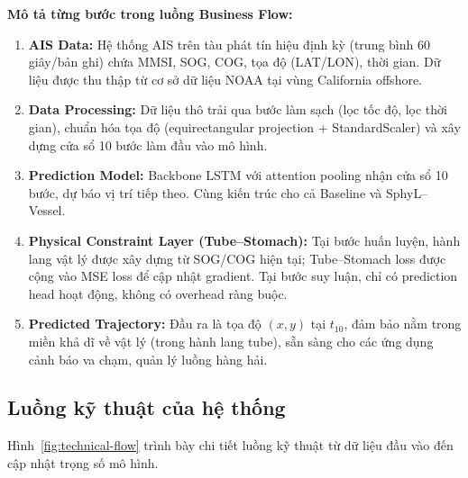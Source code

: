 \documentclass{IEEEtran}
\begin{document}
\textbf{Mô tả từng bước trong luồng Business Flow:}
\begin{enumerate}
  \item \textbf{AIS Data:} Hệ thống AIS trên tàu phát tín hiệu
        định kỳ (trung bình 60 giây/bản ghi) chứa MMSI, SOG, COG,
        tọa độ (LAT/LON), thời gian. Dữ liệu được thu thập từ
        cơ sở dữ liệu NOAA tại vùng California offshore.
  \item \textbf{Data Processing:} Dữ liệu thô trải qua bước làm sạch
        (lọc tốc độ, lọc thời gian), chuẩn hóa tọa độ (equirectangular
        projection + StandardScaler) và xây dựng cửa sổ 10 bước
        làm đầu vào mô hình.
  \item \textbf{Prediction Model:} Backbone LSTM với attention pooling
        nhận cửa sổ 10 bước, dự báo vị trí tiếp theo.
        Cùng kiến trúc cho cả Baseline và SphyL--Vessel.
  \item \textbf{Physical Constraint Layer (Tube--Stomach):}
        Tại bước huấn luyện, hành lang vật lý được xây dựng từ SOG/COG
        hiện tại; Tube--Stomach loss được cộng vào MSE loss để
        cập nhật gradient. Tại bước suy luận, chỉ có prediction head
        hoạt động, không có overhead ràng buộc.
  \item \textbf{Predicted Trajectory:} Đầu ra là tọa độ $(x,y)$
        tại $t_{10}$, đảm bảo nằm trong miền khả dĩ về vật lý
        (trong hành lang tube), sẵn sàng cho các ứng dụng
        cảnh báo va chạm, quản lý luồng hàng hải.
\end{enumerate}

\subsection{Luồng kỹ thuật của hệ thống}\label{sec:technical-flow}

Hình~\ref{fig:technical-flow} trình bày chi tiết luồng kỹ thuật từ
dữ liệu đầu vào đến cập nhật trọng số mô hình.
\end{document}
